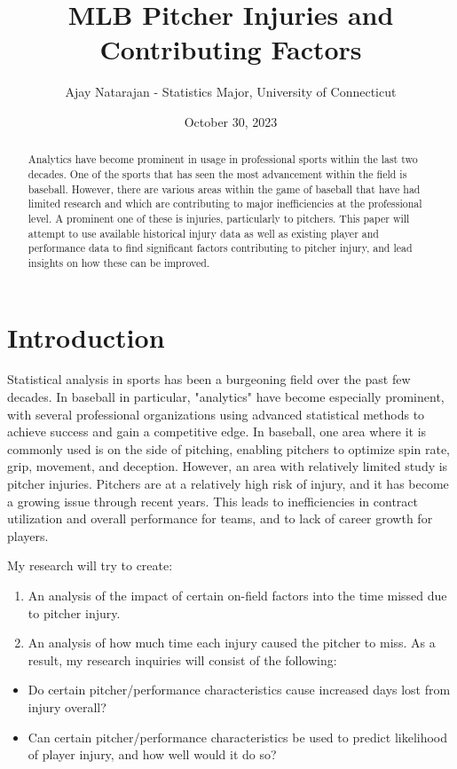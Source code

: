 \documentclass{article}
\title{MLB Pitcher Injuries and Contributing Factors}
\author{Ajay Natarajan - Statistics Major, University of Connecticut}
\date{October 30, 2023}
\begin{document}
\maketitle

\begin{abstract}
Analytics have become prominent in usage in professional sports within the last two decades. One of the sports that has seen the most advancement within the field is baseball. However, there are various areas within the game of baseball that have had limited research and which are contributing to major inefficiencies at the professional level. A prominent one of these is injuries, particularly to pitchers. This paper will attempt to use available historical injury data as well as existing player and performance data to find significant factors contributing to pitcher injury, and lead insights on how these can be improved.
\end{abstract}

\section{Introduction}
Statistical analysis in sports has been a burgeoning field over the past few decades. In baseball in particular, "analytics" have become especially prominent, with several professional organizations using advanced statistical methods to achieve success and gain a competitive edge. In baseball, one area where it is commonly used is on the side of pitching, enabling pitchers to optimize spin rate, grip, movement, and deception. However, an area with relatively limited study is pitcher injuries. Pitchers are at a relatively high risk of injury, and it has become a growing issue through recent years. This leads to inefficiencies in contract utilization and overall performance for teams, and to lack of career growth for players. 

My research will try to create:
\begin{enumerate}
\item An analysis of the impact of certain on-field factors into the time missed due to pitcher injury. 
\item An analysis of how much time each injury caused the pitcher to miss. As a result, my research inquiries will consist of the following:
\end{enumerate}
\begin{itemize}
  \item Do certain pitcher/performance characteristics cause increased days lost from injury overall?
  \item Can certain pitcher/performance characteristics be used to predict likelihood of player injury, and how well would it do so?
\end{itemize}
\end{document}
